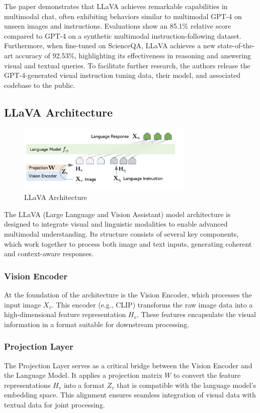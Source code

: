 \documentclass[12pt, conference, compsoc, onecolumn]{IEEEtran}
\begin{document}
	The paper demonstrates that LLaVA achieves remarkable capabilities in multimodal chat, often exhibiting behaviors similar to multimodal GPT-4 on unseen images and instructions. Evaluations show an 85.1\% relative score compared to GPT-4 on a synthetic multimodal instruction-following dataset. Furthermore, when fine-tuned on ScienceQA, LLaVA achieves a new state-of-the-art accuracy of 92.53\%, highlighting its effectiveness in reasoning and answering visual and textual queries. To facilitate further research, the authors release the GPT-4-generated visual instruction tuning data, their model, and associated codebase to the public.
	
	\subsection{LLaVA Architecture}
	\begin{figure}[H]
		\centering
		\includegraphics[width=0.75\textwidth]{figures/conceptual-diagram-of-llava.png}
		\caption{LLaVA Architecture \cite{liu2023llava}}
		\label{fig:llava_arch}
	\end{figure}
	
	The LLaVA (Large Language and Vision Assistant) model architecture is designed to integrate visual and linguistic modalities to enable advanced multimodal understanding. Its structure consists of several key components, which work together to process both image and text inputs, generating coherent and context-aware responses.
	\subsubsection*{Vision Encoder} 
	At the foundation of the architecture is the Vision Encoder, which processes the input image $X_v$. This encoder (e.g., CLIP) transforms the raw image data into a high-dimensional feature representation $H_v$. These features encapsulate the visual information in a format suitable for downstream processing.
	
	\subsubsection*{Projection Layer} 
	The Projection Layer serves as a critical bridge between the Vision Encoder and the Language Model. It applies a projection matrix $W$ to convert the feature representations $H_v$ into a format $Z_v$ that is compatible with the language model's embedding space. This alignment ensures seamless integration of visual data with textual data for joint processing.
	
\end{document}
